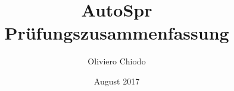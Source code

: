 \documentclass[a4paper]{article}
\title{AutoSpr Prüfungszusammenfassung}
\author{Oliviero Chiodo}
\date{August 2017}
\begin{document}
\begin{multicols*}{3}






\end{multicols*}
\end{document}
